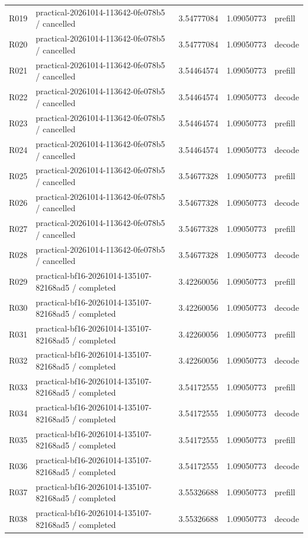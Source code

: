 \documentclass[10pt]{article}
\begin{document}
{\begin{longtable}{p{}p{}p{}p{}p{}}
R019 & practical-20261014-113642-0fe078b5 / cancelled & 3.54777084 & 1.09050773 & prefill \\
R020 & practical-20261014-113642-0fe078b5 / cancelled & 3.54777084 & 1.09050773 & decode \\
R021 & practical-20261014-113642-0fe078b5 / cancelled & 3.54464574 & 1.09050773 & prefill \\
R022 & practical-20261014-113642-0fe078b5 / cancelled & 3.54464574 & 1.09050773 & decode \\
R023 & practical-20261014-113642-0fe078b5 / cancelled & 3.54464574 & 1.09050773 & prefill \\
R024 & practical-20261014-113642-0fe078b5 / cancelled & 3.54464574 & 1.09050773 & decode \\
R025 & practical-20261014-113642-0fe078b5 / cancelled & 3.54677328 & 1.09050773 & prefill \\
R026 & practical-20261014-113642-0fe078b5 / cancelled & 3.54677328 & 1.09050773 & decode \\
R027 & practical-20261014-113642-0fe078b5 / cancelled & 3.54677328 & 1.09050773 & prefill \\
R028 & practical-20261014-113642-0fe078b5 / cancelled & 3.54677328 & 1.09050773 & decode \\
R029 & practical-bf16-20261014-135107-82168ad5 / completed & 3.42260056 & 1.09050773 & prefill \\
R030 & practical-bf16-20261014-135107-82168ad5 / completed & 3.42260056 & 1.09050773 & decode \\
R031 & practical-bf16-20261014-135107-82168ad5 / completed & 3.42260056 & 1.09050773 & prefill \\
R032 & practical-bf16-20261014-135107-82168ad5 / completed & 3.42260056 & 1.09050773 & decode \\
R033 & practical-bf16-20261014-135107-82168ad5 / completed & 3.54172555 & 1.09050773 & prefill \\
R034 & practical-bf16-20261014-135107-82168ad5 / completed & 3.54172555 & 1.09050773 & decode \\
R035 & practical-bf16-20261014-135107-82168ad5 / completed & 3.54172555 & 1.09050773 & prefill \\
R036 & practical-bf16-20261014-135107-82168ad5 / completed & 3.54172555 & 1.09050773 & decode \\
R037 & practical-bf16-20261014-135107-82168ad5 / completed & 3.55326688 & 1.09050773 & prefill \\
R038 & practical-bf16-20261014-135107-82168ad5 / completed & 3.55326688 & 1.09050773 & decode \\

\end{longtable}}
\end{document}
